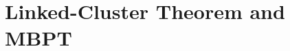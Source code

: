 \documentclass[thesis.tex]{subfiles}
\begin{document}


\section{Linked-Cluster Theorem and MBPT} \label{section:linkedcluster}
\end{document}

